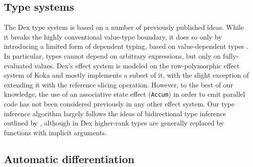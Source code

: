 \documentclass[acmsmall,screen,nonacm]{acmart}
\begin{document}
\subsection{Type systems}
\label{sec:type-systems}

The Dex type system is based on a number of previously published ideas.
While it breaks the highly conventional value-type boundary, it does so only by introducing a limited form of dependent typing, based on value-dependent types \cite{swamy2011valuedependent}.
In particular, types cannot depend on arbitrary expressions, but only on fully-evaluated values.
%
Dex's effect system is modeled on the row-polymorphic effect system of Koka \cite{leijen2014koka} and mostly implements a subset of it, with the slight exception of extending it with the reference slicing operation.
However, to the best of our knowledge, the use of an associative state effect (\texttt{Accum}) in order to emit parallel code has not been considered previously in any other effect system.
%
Our type inference algorithm largely follows the ideas of bidirectional type inference outlined by \citet{jones2007practicaltypeinference}, although in Dex higher-rank types are generally replaced by functions with implicit arguments.








\subsection{Automatic differentiation}
\label{sec:related-ad}
\end{document}
